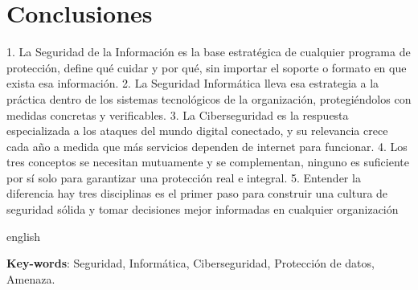 \documentclass[
	article,			%
	11pt,				%
	oneside,			%
	a4paper,			%
	english,			%
	brazil,				%
	sumario=tradicional
	]{abntex2}
\begin{document}
\section{Conclusiones}
1. La Seguridad de la Información es la base estratégica de cualquier programa de protección, define qué cuidar y por qué, sin importar el soporte o formato en que exista esa información.
2. La Seguridad Informática lleva esa estrategia a la práctica dentro de los sistemas tecnológicos de la organización, protegiéndolos con medidas concretas y verificables.
3. La Ciberseguridad es la respuesta especializada a los ataques del mundo digital conectado, y su relevancia crece cada año a medida que más servicios dependen de internet para funcionar.
4. Los tres conceptos se necesitan mutuamente y se complementan, ninguno es suficiente por sí solo para garantizar una protección real e integral.
5. Entender la diferencia hay tres disciplinas es el primer paso para construir una cultura de seguridad sólida y tomar decisiones mejor informadas en cualquier organización

% 








\emptythanks
\maketitle

\begin{columnaderesumen}
 \begin{otherlanguage*}{english}

   \vspace{\onelineskip}
 
   \noindent
   \textbf{Key-words}: Seguridad, Informática, Ciberseguridad, Protección de datos, Amenaza.
 \end{otherlanguage*}  
\end{columnaderesumen}
\end{document}
